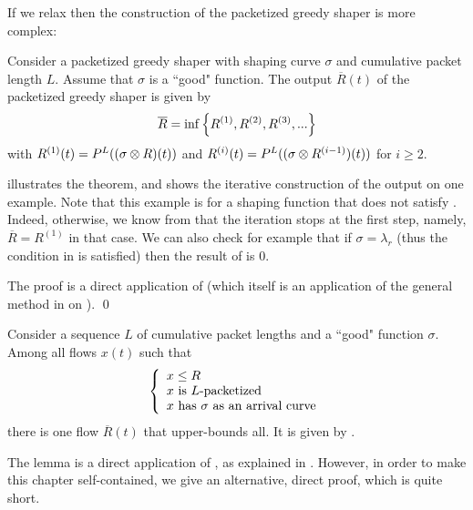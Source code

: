 If we relax  then the construction of the
packetized greedy shaper is more complex:
\begin{theorem}
Consider a packetized greedy shaper with shaping curve $\sigma$
and cumulative packet length $L$. Assume that $\sigma$ is a
``good" function. The output $\overline{R}(t)$ of the packetized
greedy shaper is given by
\begin{equation}\mylabel{eq-sp3}
\overline{R} = \inf
 \left\{ R^{(1)},  R^{(2)}, R^{(3)}, ...
 \right\}
\end{equation}
with $R^{(1)}(t)=P^L((\sigma \otimes  R)(t))$ and $R^{(i)}(t)=P^L(
(\sigma \otimes R^{(i-1)})(t))$ for $i\geq 2$.
\end{theorem}
 illustrates the theorem, and shows the
iterative construction of the output on one example. Note that
this example is for a shaping function that does not satisfy
. Indeed, otherwise, we know from
 that the iteration stops at the first
step, namely, $\overline{R}=R^{(1)}$ in that case. We can also
check for example that if $\sigma=\lambda_r$ (thus the condition
in  is satisfied) then the result of
 is $0$.
\begin{figure}[htbp]
\end{figure}
\pr
The proof is a direct application of  (which
itself is an application of the general method in
 on ).
\qed

\begin{lemma}
Consider a sequence $L$ of cumulative packet lengths and a ``good"
function $\sigma$. Among all flows $x(t)$ such that
\begin{equation}\mylabel{eq-sp2}
  \bracket {
  x \leq R \\
  x \mbox{ is } L \mbox{-packetized}\\
  x \mbox{ has } \sigma \mbox{ as an arrival curve}
  }
\end{equation}
there is one flow $\overline{R}(t)$ that upper-bounds all. It is
given by .
  \end{lemma}
  \pr
 The lemma is a direct application of , as
 explained in . However, in
 order to make this chapter self-contained, we give an alternative, direct
 proof, which is quite short.

